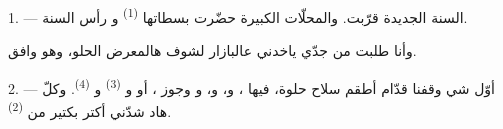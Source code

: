 %
%

\VUsaut{4.0mm}
\VUsaut{2.0mm}
\VUsaut{3.4mm}

1. --- السنة الجديدة قرّبت. والمحلّات الكبيرة حضّرت بسطاتها
 \textsuperscript{(1)} و رأس السنة.

وأنا طلبت من جدّي ياخدني عالبازار لشوف هالمعرض الحلو، وهو وافق.

2. --- أوّل شي وقفنا قدّام أطقم سلاح حلوة، فيها ،
و، و، و وجوز
، أو  و \textsuperscript{(3)}
و \textsuperscript{(4)}. وكلّ هاد شدّني أكتر بكتير من
 \textsuperscript{(2)}.

\VUsaut{3.0mm}
\VUsaut{2.6mm}

